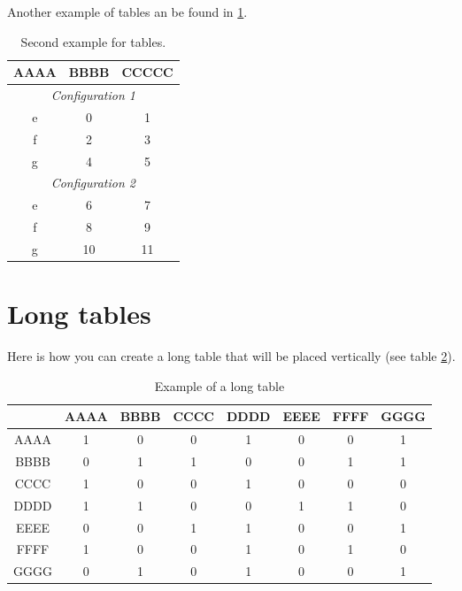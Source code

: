 Another example of tables an be found in \ref{tab:Example2}.

\begin{table}[H]
\begin{center}
%
\caption{Second example for tables.}
\label{tab:Example2}
%
\begin{tabular*}{0.4\textwidth}{@{\extracolsep{\fill}}ccc}
%
\toprule
\toprule
%
\textbf{AAAA} & \textbf{BBBB} & \textbf{CCCCC} \\
%
\midrule
\multicolumn{3}{c}{\textit{Configuration 1}}\\
\midrule
e & 0 & 1 \\
f & 2 & 3 \\
g & 4 & 5 \\
%
\midrule
\multicolumn{3}{c}{\textit{Configuration 2}}\\
\midrule
e & 6 & 7 \\
f & 8 & 9 \\
g & 10 & 11 \\
%
\bottomrule
\bottomrule
%
\end{tabular*}
%
\end{center}
\end{table}

\section{Long tables}

Here is how you can create a long table that will be placed vertically (see
table \ref{tab:LongTable}).

\begin{landscape}
%
\begin{table}[H]
\begin{center}
%
\caption{Example of a long table}
\label{tab:LongTable}
%
\begin{tabular*}{0.9\linewidth}{@{\extracolsep{\fill}}cccccccc}

%
\toprule
\toprule
%
 & \textbf{AAAA} & \textbf{BBBB} & \textbf{CCCC} & \textbf{DDDD} & \textbf{EEEE} & \textbf{FFFF} & \textbf{GGGG} \\
%
\midrule
%
AAAA & 1 & 0 & 0 & 1 & 0 & 0 & 1 \\
BBBB & 0 & 1 & 1 & 0 & 0 & 1 & 1 \\
CCCC & 1 & 0 & 0 & 1 & 0 & 0 & 0 \\
DDDD & 1 & 1 & 0 & 0 & 1 & 1 & 0 \\
EEEE & 0 & 0 & 1 & 1 & 0 & 0 & 1 \\
FFFF & 1 & 0 & 0 & 1 & 0 & 1 & 0 \\
GGGG & 0 & 1 & 0 & 1 & 0 & 0 & 1 \\
%
\bottomrule
\bottomrule
%
\end{tabular*}
%
\end{center}
\end{table}
%
\end{landscape}

